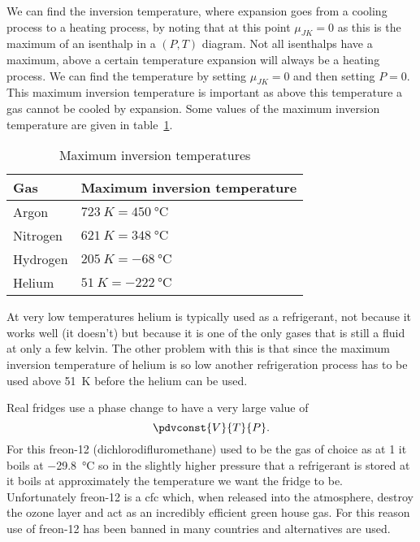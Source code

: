     We can find the inversion temperature, where expansion goes from a cooling process to a heating process, by noting that at this point \(\mu_{JK} = 0\) as this is the maximum of an isenthalp in a \((P, T)\) diagram.
    Not all isenthalps have a maximum, above a certain temperature expansion will always be a heating process.
    We can find the temperature by setting \(\mu_{JK} = 0\) and then setting \(P = 0\).
    This maximum inversion temperature is important as above this temperature a gas cannot be cooled by expansion.
    Some values of the maximum inversion temperature are given in table~\ref{tab:maximum inversion temperatures}.
    \begin{table}[ht]
        \centering
        \begin{tabular}{ll}\hline
            Gas & Maximum inversion temperature\\\hline
            Argon & \(\SI{723}{K} = \SI{450}{\degreeCelsius}\)\\
            Nitrogen & \(\SI{621}{K} = \SI{348}{\degreeCelsius}\)\\
            Hydrogen & \(\SI{205}{K} = \SI{-68}{\degreeCelsius}\)\\
            Helium & \(\SI{51}{K} = \SI{-222}{\degreeCelsius}\)\\\hline
        \end{tabular}
        \caption{Maximum inversion temperatures}
        \label{tab:maximum inversion temperatures}
    \end{table}
    At very low temperatures helium is typically used as a refrigerant, not because it works well (it doesn't) but because it is one of the only gases that is still a fluid at only a few kelvin.
    The other problem with this is that since the maximum inversion temperature of helium is so low another refrigeration process has to be used above \SI{51}{\kelvin} before the helium can be used.
    
    Real fridges use a phase change to have a very large value of
    \[\pdvconst{V}{T}{P}.\]
    For this freon-12 (dichlorodifluromethane) used to be the gas of choice as at \SI{1}{\atm} it boils at \SI{-29.8}{\degreeCelsius} so in the slightly higher pressure that a refrigerant is stored at it boils at approximately the temperature we want the fridge to be.
    Unfortunately freon-12 is a \gls{cfc} which, when released into the atmosphere, destroy the ozone layer and act as an incredibly efficient green house gas.
    For this reason use of freon-12 has been banned in many countries and alternatives are used.
    
